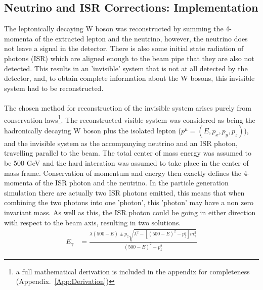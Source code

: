 \subsection{Neutrino and ISR Corrections: Implementation}
\label{SUBSEC:ISRImplementation}
The leptonically decaying W boson was reconstructed by summing the 4-momenta of the extracted lepton and the neutrino, however, the neutrino does not leave a signal in the detector. There is also some initial state radiation of photons (ISR) which are aligned enough to the beam pipe that they are also not detected. This results in an 'invisible' system that is not at all detected by the detector, and, to obtain complete information about the W bosons, this invisible system had to be reconstructed.
\\\\
The chosen method for reconstruction of the invisible system arises purely from conservation laws\footnote{ a full mathematical derivation is included in the appendix for completeness (Appendix.~\ref{App:Derivation})}. The reconstructed visible system was considered as being the hadronically decaying W boson plus the isolated lepton (${p}^{\mu} = ( E,  {p}_{x}, {p}_{y}, {p}_{z})$), and the invisible system as the accompanying neutrino and an ISR photon, travelling parallel to the beam. The total center of mass energy was assumed to be 500 GeV and the hard interation was assumed to take place in the center of mass frame. Conservation of momentum and energy then exactly defines the 4-momenta of the ISR photon and the neutrino. In the particle generation simulation there are actually two ISR photons emitted, this means that when combining the two photons into one 'photon', this 'photon' may have a non zero invariant mass. As well as this, the ISR photon could be going in either direction with respect to the beam axis, resulting in two solutions.
\begin{align}
\label{EQ:Full}
{E}_{\gamma}    &= \frac{{\lambda}(500 - E)  \pm {p}_{z}\sqrt{ {\lambda}^{2} - [{(500 - E)}^{2} -{p}_{z}^{2}]{m}_{\gamma}^{2}}}{{(500 - E)}^{2} -   {p}_{z}^{2}}
   \end{align}

